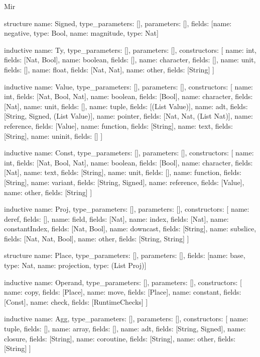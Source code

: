 \begin{lexlean}{Mir}
\begin{semanticmodule}
structure{
  name: Signed,
  type_parameters: [],
  parameters: [],
  fields: [{name: negative, type: Bool}, {name: magnitude, type: Nat}]
}

inductive{
  name: Ty,
  type_parameters: [],
  parameters: [],
  constructors: [
    {name: int, fields: [Nat, Bool]},
    {name: boolean, fields: []},
    {name: character, fields: []},
    {name: unit, fields: []},
    {name: float, fields: [Nat, Nat]},
    {name: other, fields: [String]}
  ]
}

inductive{
  name: Value,
  type_parameters: [],
  parameters: [],
  constructors: [
    {name: int, fields: [Nat, Bool, Nat]},
    {name: boolean, fields: [Bool]},
    {name: character, fields: [Nat]},
    {name: unit, fields: []},
    {name: tuple, fields: [(List Value)]},
    {name: adt, fields: [String, Signed, (List Value)]},
    {name: pointer, fields: [Nat, Nat, (List Nat)]},
    {name: reference, fields: [Value]},
    {name: function, fields: [String]},
    {name: text, fields: [String]},
    {name: uninit, fields: []}
  ]
}

inductive{
  name: Const,
  type_parameters: [],
  parameters: [],
  constructors: [
    {name: int, fields: [Nat, Bool, Nat]},
    {name: boolean, fields: [Bool]},
    {name: character, fields: [Nat]},
    {name: text, fields: [String]},
    {name: unit, fields: []},
    {name: function, fields: [String]},
    {name: variant, fields: [String, Signed]},
    {name: reference, fields: [Value]},
    {name: other, fields: [String]}
  ]
}

inductive{
  name: Proj,
  type_parameters: [],
  parameters: [],
  constructors: [
    {name: deref, fields: []},
    {name: field, fields: [Nat]},
    {name: index, fields: [Nat]},
    {name: constantIndex, fields: [Nat, Bool]},
    {name: downcast, fields: [String]},
    {name: subslice, fields: [Nat, Nat, Bool]},
    {name: other, fields: [String, String]}
  ]
}

structure{
  name: Place,
  type_parameters: [],
  parameters: [],
  fields: [{name: base, type: Nat}, {name: projection, type: (List Proj)}]
}

inductive{
  name: Operand,
  type_parameters: [],
  parameters: [],
  constructors: [
    {name: copy, fields: [Place]},
    {name: move, fields: [Place]},
    {name: constant, fields: [Const]},
    {name: check, fields: [RuntimeChecks]}
  ]
}

inductive{
  name: Agg,
  type_parameters: [],
  parameters: [],
  constructors: [
    {name: tuple, fields: []},
    {name: array, fields: []},
    {name: adt, fields: [String, Signed]},
    {name: closure, fields: [String]},
    {name: coroutine, fields: [String]},
    {name: other, fields: [String]}
  ]
}


\end{semanticmodule}
\end{lexlean}
